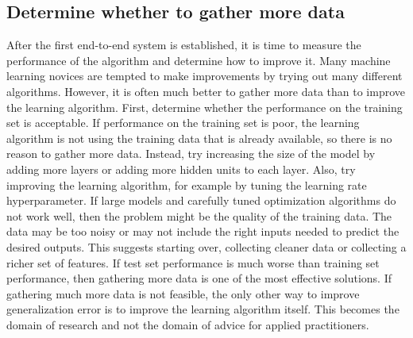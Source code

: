 \subsection{Determine whether to gather more data}
After the first end-to-end system is established, it is time to measure the performance of the algorithm and determine how to improve it. Many machine learning novices are tempted to make improvements by trying out many different algorithms. However, it is often much better to gather more data than to improve the learning algorithm.\newline\newline
First, determine whether the performance on the training set is acceptable. If performance on the training set is poor, the learning algorithm is not using the training data that is already
available, so there is no reason to gather more data. Instead, try increasing the size of the model by adding more layers or adding more hidden units to each layer.\newline\newline
Also, try improving the learning algorithm, for example by tuning the learning rate hyperparameter. If large models and carefully tuned optimization algorithms do not work well, then the problem might be the quality of the training data. The data may be too noisy or may not include the right inputs needed to predict the desired outputs. This suggests starting over, collecting cleaner data or collecting a richer set of features.\newline\newline
If test set performance is much worse than training set performance, then gathering more data is one of the most effective solutions.
If gathering much more data is not feasible, the only other way to improve generalization error is to improve the learning algorithm itself. This becomes the domain of research and not the domain of advice for applied practitioners.

